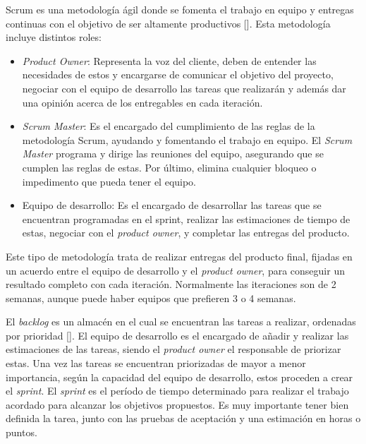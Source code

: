 Scrum es una metodología ágil donde se fomenta el trabajo en equipo y entregas continuas con el objetivo de ser altamente productivos [\cite{92}]. Esta metodología incluye distintos roles:
\begin{itemize}
\item \textit{Product Owner}: Representa la voz del cliente, deben de entender las necesidades de estos y encargarse de comunicar el objetivo del proyecto, negociar con el equipo de desarrollo las tareas que realizarán y además dar una opinión acerca de los entregables en cada iteración.
\item \textit{Scrum Master}: Es el encargado del cumplimiento de las reglas de la metodología Scrum, ayudando y fomentando el trabajo en equipo. El \textit{Scrum Master} programa y dirige las reuniones del equipo, asegurando que se cumplen las reglas de estas. Por último, elimina cualquier bloqueo o impedimento que pueda tener el equipo.
\item Equipo de desarrollo: Es el encargado de desarrollar las tareas que se encuentran programadas en el sprint, realizar las estimaciones de tiempo de estas, negociar con el \textit{product owner}, y completar las entregas del producto.
\end{itemize}

%

Este tipo de metodología trata de realizar entregas del producto final, fijadas en un acuerdo entre el equipo de desarrollo y el \textit{product owner}, para conseguir un resultado completo con cada iteración. Normalmente las iteraciones son de 2 semanas, aunque puede haber equipos que prefieren 3 o 4 semanas.

El \textit{backlog} es un almacén en el cual se encuentran las tareas a realizar, ordenadas por prioridad [\cite{93}]. El equipo de desarrollo es el encargado de añadir y realizar las estimaciones de las tareas, siendo el \textit{product owner} el responsable de priorizar estas. Una vez las tareas se encuentran priorizadas de mayor a menor importancia, según la capacidad del equipo de desarrollo, estos proceden a crear el \textit{sprint}. El \textit{sprint} es el período de tiempo determinado para realizar el trabajo acordado para alcanzar los objetivos propuestos. Es muy importante tener bien definida la tarea, junto con las pruebas de aceptación y una estimación en horas o puntos.

